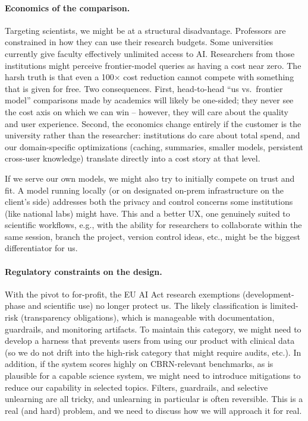 \paragraph{Economics of the comparison.}
Targeting scientists, we might be at a structural disadvantage. Professors are constrained in how they can use their research budgets. Some universities currently give faculty effectively unlimited access to AI. Researchers from those institutions might perceive frontier-model queries as having a cost near zero. The harsh truth is that even a 100$\times$ cost reduction cannot compete with something that is given for free. Two consequences. First, head-to-head ``us vs.\ frontier model'' comparisons made by academics will likely be one-sided; they never see the cost axis on which we can win -- however, they will care about the quality and user experience. Second, the economics change entirely if the customer is the university rather than the researcher: institutions do care about total spend, and our domain-specific optimizations (caching, summaries, smaller models, persistent cross-user knowledge) translate directly into a cost story at that level.

If we serve our own models, we might also try to initially compete on trust and fit. A model running locally (or on designated on-prem infrastructure on the client's side) addresses both the privacy and control concerns some institutions (like national labs) might have.
This and a better UX, one genuinely suited to scientific workflows, e.g., with the ability for researchers to collaborate within the same session, branch the project, version control ideas, etc., might be the biggest differentiator for us.

\paragraph{Regulatory constraints on the design.}
With the pivot to for-profit, the EU AI Act research exemptions (development-phase and scientific use) no longer protect us. The likely classification is limited-risk (transparency obligations), which is manageable with documentation, guardrails, and monitoring artifacts. To maintain this category, we might need to develop a harness that prevents users from using our product with clinical data (so we do not drift into the high-risk category that might require audits, etc.). In addition, if the system scores highly on CBRN-relevant benchmarks, as is plausible for a capable science system, we might need to introduce mitigations to reduce our capability in selected topics. Filters, guardrails, and selective unlearning are all tricky, and unlearning in particular is often reversible. This is a real (and hard) problem, and we need to discuss how we will approach it for real.

